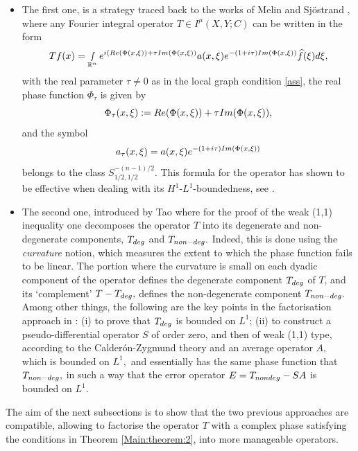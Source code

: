 \documentclass[12pt, reqno]{amsart}
\theoremstyle{definition}
\theoremstyle{remark}
\numberwithin{equation}{section}
\begin{document}
\begin{itemize}
    \item The first one, is a strategy traced back to the works of Melin and Sj\"ostrand  \cite{Melin:Sjostrand1975,Melin:Sjostrand1976}, where any Fourier integral operator $T\in I^\mu(X,Y;C)$ can be written in the form
\begin{equation}
  Tf(x)= \smallint\limits_{\mathbb{R}^n}e^{i(\textnormal{Re}(\Phi(x,\xi))+\tau \textnormal{Im}(\Phi(x,\xi) )}a(x,\xi)e^{-(1+i\tau)\textnormal{Im}(\Phi(x,\xi) )}\widehat{f}(\xi)d\xi ,
\end{equation}with the real parameter $\tau\neq0$ as in the local graph condition \eqref{ass}, the real phase function $\Phi_{\tau}$ is given by 
\begin{equation}\label{Phi:tau:rem}
    \Phi_{\tau}(x,\xi):=\textnormal{Re}(\Phi(x,\xi))+\tau \textnormal{Im}(\Phi(x,\xi) ),
\end{equation}
and  the symbol
$$ a_\tau(x,\xi)= a(x,\xi)e^{-(1+i\tau)\textnormal{Im}(\Phi(x,\xi) )}$$
belongs to the class $S^{-(n-1)/2}_{1/2,1/2}.$ This formula for the operator has shown to be effective when dealing with its $H^1$-$L^1$-boundedness, see \cite{Ruzhansky:CWI-book}.
\item The second one, introduced by Tao \cite{Tao} where for the proof of the weak (1,1) inequality one decomposes the operator $T$ into its degenerate and non-degenerate components, $T_{\textnormal{deg}}$ and $T_{\textnormal{non-deg}}.$  Indeed, this is done using the {\it curvature} notion, which measures the extent to which the phase function fails to be linear. The portion where the curvature is small on each dyadic component of the operator defines the degenerate component $T_{\textnormal{deg}}$ of $T$, and its `complement' $T-T_{\textnormal{deg}},$ defines the non-degenerate component $T_{\textnormal{non-deg}}.$ Among other things, the following are the key points in the factorisation approach in  \cite{Tao}: (i) to prove that  $T_{\textnormal{deg}}$ is bounded on $L^1$; (ii) to construct a pseudo-differential operator $S$ of order zero, and then of weak (1,1) type, according to the Calder\'on-Zygmund theory and an average operator $A,$ which is bounded on $L^1,$ and essentially has the same phase function that $T_{\textnormal{non-deg}},$ in such a way that the error operator $E=T_{\textnormal{nondeg}}-SA$ is bounded on $L^1.$
\end{itemize}
The aim of the next subsections is to show that the two previous approaches are compatible, allowing to factorise the operator $T$ with a complex phase satisfying the conditions in Theorem  \ref{Main:theorem:2}, into more manageable operators. %
\end{document}
